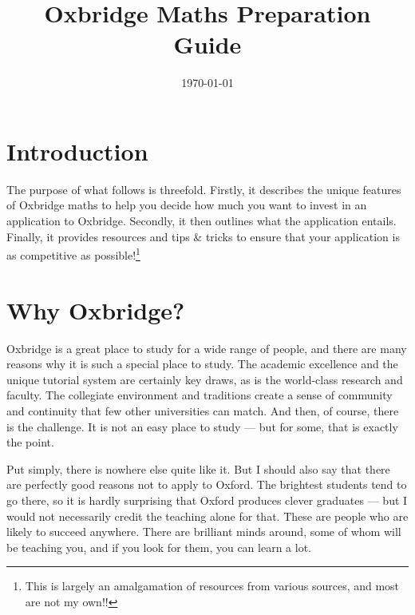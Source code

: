 \documentclass[11pt]{article}
\title{\textbf{Oxbridge Maths Preparation Guide}}
\date{\today}
\newif\ifshowcomments
\newif\ifshowpersonal
\newcommand{\studentname}{Anonymous}
\renewcommand{\studentname}{Qasim}
\newcommand{\comment}[1]{\ifshowcomments\textcolor{myblue}{\textbf{#1}}\fi}
\newcommand{\personal}[1]{\ifshowpersonal\textcolor{myorange}{\emph{#1}}\fi}
\begin{document}
\maketitle

\bigskip

\section{Introduction}
\noindent
The purpose of what follows is threefold. Firstly, it describes the unique features of Oxbridge maths to help you decide how much you want to invest in an application to Oxbridge. Secondly, it then outlines what the application entails. Finally, it provides resources and tips \& tricks to ensure that your application is as competitive as possible!\footnote{This is largely an amalgamation of resources from various sources, and most are not my own!!}  

\ifshowcomments
To make it more personable, I have added comments specific to you \comment{(\studentname)} in \comment{bold}.
\fi
\ifshowpersonal 
Comments on what my own experience was like are given in \personal{italics}.
\fi


\section{Why Oxbridge?}

Oxbridge is a great place to study for a wide range of people, and there are many reasons why it is such a special place to study. The academic excellence and the unique tutorial system are certainly key draws, as is the world-class research and faculty. The collegiate environment and traditions create a sense of community and continuity that few other universities can match. And then, of course, there is the challenge. It is not an easy place to study --- but for some, that is exactly the point.

Put simply, there is nowhere else quite like it. But I should also say that there are perfectly good reasons not to apply to Oxford. The brightest students tend to go there, so it is hardly surprising that Oxford produces clever graduates --- but I would not necessarily credit the teaching alone for that. These are people who are likely to succeed anywhere. There are brilliant minds around, some of whom will be teaching you, and if you look for them, you can learn a lot.
\end{document}
